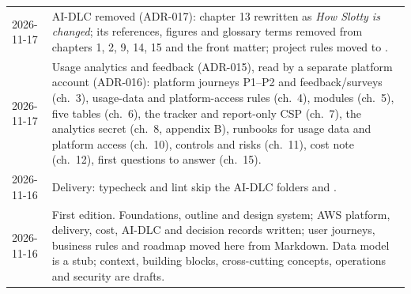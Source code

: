 \begin{xltabular}{\linewidth}{@{}l L@{}}
  2026-11-17 & AI-DLC removed (ADR-017): chapter 13 rewritten as \emph{How Slotty is changed}; its references, figures and glossary terms removed from chapters 1, 2, 9, 14, 15 and the front matter; project rules moved to .\\
  2026-11-17 & Usage analytics and feedback (ADR-015), read by a separate platform account (ADR-016): platform journeys P1--P2 and feedback/surveys (ch.~3), usage-data and platform-access rules (ch.~4), modules (ch.~5), five tables (ch.~6), the tracker and report-only CSP (ch.~7), the analytics secret (ch.~8, appendix B), runbooks for usage data and platform access (ch.~10), controls and risks (ch.~11), cost note (ch.~12), first questions to answer (ch.~15).\\
  2026-11-16 & Delivery: typecheck and lint skip the AI-DLC folders  and .\\
  2026-11-16 & First edition. Foundations, outline and design system; AWS platform, delivery, cost,
    AI-DLC and decision records written; user journeys, business rules and roadmap moved here from
    Markdown. Data model is a stub; context, building blocks, cross-cutting concepts, operations
    and security are drafts.\\
  \bottomrule
\end{xltabular}

